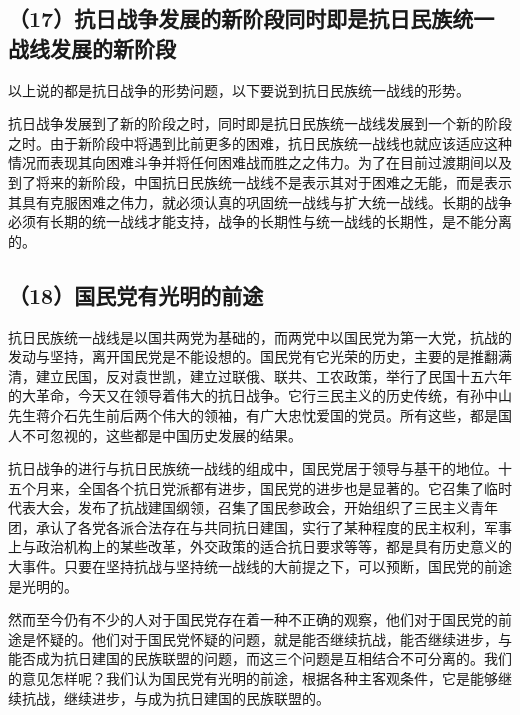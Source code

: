 \subsection{（17）抗日战争发展的新阶段同时即是抗日民族统一战线发展的新阶段}

以上说的都是抗日战争的形势问题，以下要说到抗日民族统一战线的形势。

抗日战争发展到了新的阶段之时，同时即是抗日民族统一战线发展到一个新的阶段之时。由于新阶段中将遇到比前更多的困难，抗日民族统一战线也就应该适应这种情况而表现其向困难斗争并将任何困难战而胜之之伟力。为了在目前过渡期间以及到了将来的新阶段，中国抗日民族统一战线不是表示其对于困难之无能，而是表示其具有克服困难之伟力，就必须认真的巩固统一战线与扩大统一战线。长期的战争必须有长期的统一战线才能支持，战争的长期性与统一战线的长期性，是不能分离的。

\subsection{（18）国民党有光明的前途}

抗日民族统一战线是以国共两党为基础的，而两党中以国民党为第一大党，抗战的发动与坚持，离开国民党是不能设想的。国民党有它光荣的历史，主要的是推翻满清，建立民国，反对袁世凯，建立过联俄、联共、工农政策，举行了民国十五六年的大革命，今天又在领导着伟大的抗日战争。它行三民主义的历史传统，有孙中山先生蒋介石先生前后两个伟大的领袖，有广大忠忱爱国的党员。所有这些，都是国人不可忽视的，这些都是中国历史发展的结果。

抗日战争的进行与抗日民族统一战线的组成中，国民党居于领导与基干的地位。十五个月来，全国各个抗日党派都有进步，国民党的进步也是显著的。它召集了临时代表大会，发布了抗战建国纲领，召集了国民参政会，开始组织了三民主义青年团，承认了各党各派合法存在与共同抗日建国，实行了某种程度的民主权利，军事上与政治机构上的某些改革，外交政策的适合抗日要求等等，都是具有历史意义的大事件。只要在坚持抗战与坚持统一战线的大前提之下，可以预断，国民党的前途是光明的。

然而至今仍有不少的人对于国民党存在着一种不正确的观察，他们对于国民党的前途是怀疑的。他们对于国民党怀疑的问题，就是能否继续抗战，能否继续进步，与能否成为抗日建国的民族联盟的问题，而这三个问题是互相结合不可分离的。我们的意见怎样呢？我们认为国民党有光明的前途，根据各种主客观条件，它是能够继续抗战，继续进步，与成为抗日建国的民族联盟的。

